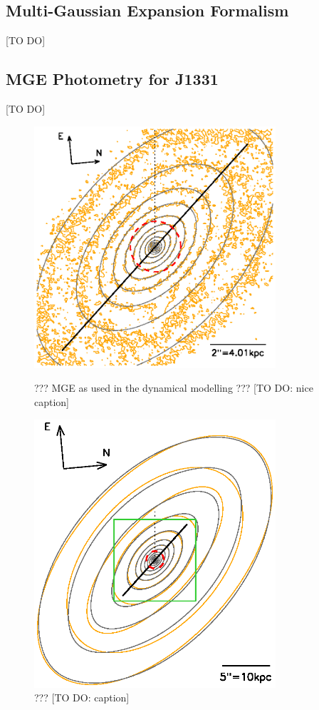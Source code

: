 \documentclass[useAMS,usenatbib]{mn2e}
\begin{document}
\subsection{Multi-Gaussian Expansion Formalism}

[TO DO]

\subsection{MGE Photometry for J1331}

[TO DO]

\begin{figure}
\begin{minipage}[c]{\linewidth}
\centering
\includegraphics[width=0.8\textwidth]{fig/1331F814Wsci_MGE_M.ps}
\caption{??? MGE as used in the dynamical modelling ??? [TO DO: nice caption]}
\label{fig:???}
\end{minipage}
\begin{minipage}[c]{\linewidth}
\centering
\includegraphics[width=0.8\textwidth]{fig/1331F814W_MGE_disk_L.ps}
\caption{??? [TO DO: caption]}
\label{fig:???}
\end{minipage}
\end{figure}
\end{document}
